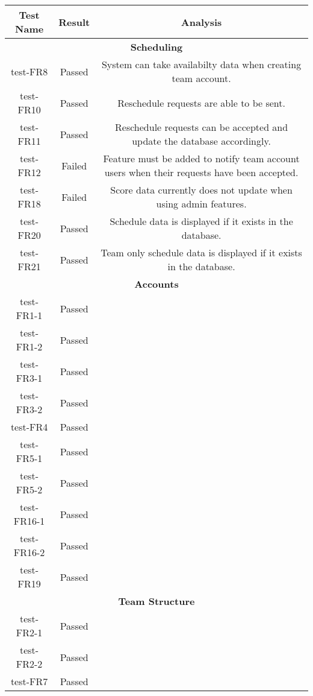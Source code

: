 \documentclass[12pt, titlepage]{article}
\begin{document}
\begin{longtable}{|c|c|c|}
  \hline
  \textbf{Test Name} & \textbf{Result} & \textbf{Analysis}\\
  \hline
  \multicolumn{3}{|c|}{\textbf{Scheduling}}\\
  \hline
  test-FR8 & Passed & System can take availabilty data when creating team
  account.\\
  \hline
  test-FR10 & Passed & Reschedule requests are able to be sent.\\
  \hline
  test-FR11 & Passed & Reschedule requests can be accepted and update the
  database accordingly.\\
  \hline
  test-FR12 & Failed & Feature must be added to notify team account users
  when their requests have been accepted.\\
  \hline
  test-FR18 & Failed & Score data currently does not update when using admin
  features.\\
  \hline
  test-FR20 & Passed & Schedule data is displayed if it exists in the
  database.\\
  \hline
  test-FR21 & Passed & Team only schedule data is displayed if it exists in
  the database.\\
  \hline
  \multicolumn{3}{|c|}{\textbf{Accounts}} \\
  \hline
  test-FR1-1 & Passed & \\
  \hline
  test-FR1-2 & Passed & \\
  \hline
  test-FR3-1 & Passed & \\
  \hline
  test-FR3-2 & Passed & \\
  \hline
  test-FR4 & Passed & \\
  \hline
  test-FR5-1 & Passed & \\
  \hline
  test-FR5-2 & Passed & \\
  \hline
  test-FR16-1 & Passed & \\
  \hline
  test-FR16-2 & Passed & \\
  \hline
  test-FR19 & Passed & \\
  \hline
  \multicolumn{3}{|c|}{\textbf{Team Structure}} \\
  \hline
  test-FR2-1 & Passed & \\
  \hline
  test-FR2-2 & Passed & \\
  \hline
  test-FR7 & Passed & \\

\end{longtable}
\end{document}
